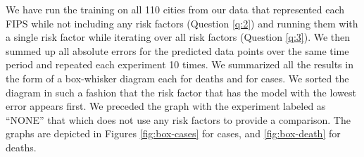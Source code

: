 \documentclass[12pt]{article}
\theoremstyle{definition}
\renewcommand{\_}{%
    \textunderscore\hspace{0pt}%
}
\begin{document}

We have run the training on all 110 cities from our data that represented each FIPS while not including any risk factors (Question \ref{q:2}) and running them with a single risk factor while iterating over all risk factors (Question \ref{q:3}). We then summed up all absolute errors for the predicted data points over the same time period and repeated each experiment 10 times. We summarized all the results in the form of a box-whisker diagram each for deaths and for cases. We sorted the diagram in such a fashion that the risk factor that has the model with the lowest error appears first. We preceded the graph with the experiment labeled as ``NONE'' that which does not use any risk factors to provide a comparison. The graphs are depicted in Figures \ref{fig:box-cases} for cases, and \ref{fig:box-death} for deaths. 
\end{document}
